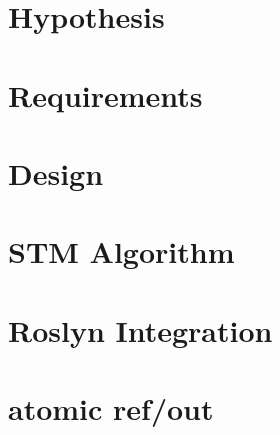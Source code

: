 \section{Hypothesis}
\section{Requirements}
\section{Design}
\section{STM Algorithm}
\section{Roslyn Integration}
\section{atomic ref/out}
\worksheetend
